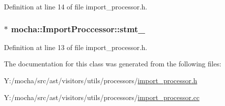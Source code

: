 Definition at line 14 of file import\_\-processor.h.

\hypertarget{classmocha_1_1_import_proccessor_a4ab40916756695c1fa816533ec3156d4}{
\subsubsection[{stmt\_\-}]{$\ast$ {\bf mocha::ImportProccessor::stmt\_\-}}}
\label{classmocha_1_1_import_proccessor_a4ab40916756695c1fa816533ec3156d4}


Definition at line 13 of file import\_\-processor.h.



The documentation for this class was generated from the following files:\begin{DoxyCompactItemize}
\item 
Y:/mocha/src/ast/visitors/utils/processors/\hyperlink{import__processor_8h}{import\_\-processor.h}\item 
Y:/mocha/src/ast/visitors/utils/processors/\hyperlink{import__processor_8cc}{import\_\-processor.cc}\end{DoxyCompactItemize}
